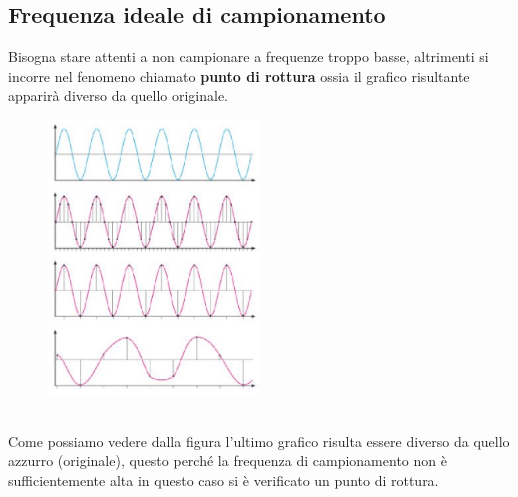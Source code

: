 \documentclass[12pt, a4paper]{report}
\begin{document}
\subsection{Frequenza ideale di campionamento}
Bisogna stare attenti a non campionare a frequenze troppo basse, altrimenti si incorre nel fenomeno chiamato \textbf{punto di rottura} ossia il grafico risultante apparirà diverso da quello originale.
\begin{figure}[h!]
    \centering
    \includegraphics[width=0.5\textwidth]{Immagini/campionamento.png}
\end{figure}
\\Come possiamo vedere dalla figura l'ultimo grafico risulta essere diverso da quello azzurro (originale), questo perché la frequenza di campionamento non è sufficientemente alta in questo caso si è verificato un punto di rottura.
\newpage
\end{document}
